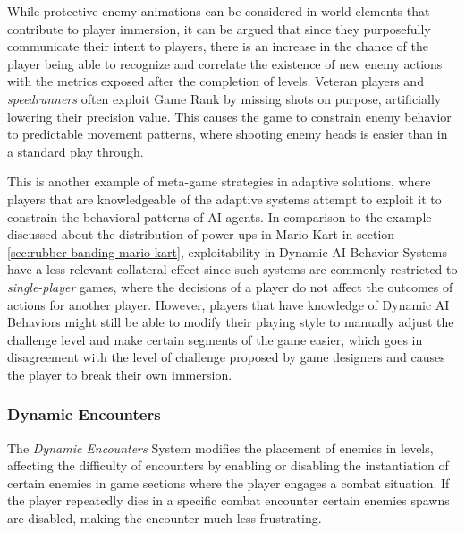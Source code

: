 While protective enemy animations can be considered in-world elements that contribute to player immersion, it can be argued that since they purposefully communicate their intent to players, there is an increase in the chance of the player being able to recognize and correlate the existence of new enemy actions with the metrics exposed after the completion of levels. Veteran players and \emph{speedrunners} often exploit Game Rank by missing shots on purpose, artificially lowering their precision value. This causes the game to constrain enemy behavior to predictable movement patterns, where shooting enemy heads is easier than in a standard play through.

This is another example of meta-game strategies in adaptive solutions, where players that are knowledgeable of the adaptive systems attempt to exploit it to constrain the behavioral patterns of AI agents. In comparison to the example discussed about the distribution of power-ups in Mario Kart in section \ref{sec:rubber-banding-mario-kart}, exploitability in Dynamic AI Behavior Systems have a less relevant collateral effect since such systems are commonly restricted to \emph{single-player} games, where the decisions of a player do not affect the outcomes of actions for another player. However, players that have knowledge of Dynamic AI Behaviors might still be able to modify their playing style to manually adjust the challenge level and make certain segments of the game easier, which goes in disagreement with the level of challenge proposed by game designers and causes the player to break their own immersion.

\subsubsection{Dynamic Encounters}



The \emph{Dynamic Encounters} System modifies the placement of enemies in levels, affecting the difficulty of encounters by enabling or disabling the instantiation of certain enemies in game sections where the player engages a combat situation. If the player repeatedly dies in a specific combat encounter certain enemies spawns are disabled, making the encounter much less frustrating. 

